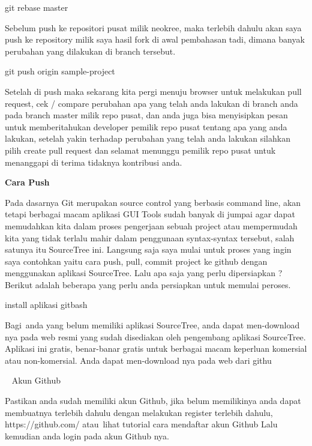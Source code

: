 \noindent 
git rebase master \par
\noindent 
Sebelum push ke repositori pusat milik neokree, maka terlebih dahulu akan saya push ke repository milik saya hasil fork di awal pembahasan tadi, dimana banyak perubahan yang dilakukan di branch tersebut. \par
\noindent 
git push origin sample-project \par
\noindent 
Setelah di push maka sekarang kita pergi menuju browser untuk melakukan pull request, cek / compare perubahan apa yang telah anda lakukan di branch anda pada branch master milik repo pusat, dan anda juga bisa menyisipkan pesan untuk memberitahukan developer pemilik repo pusat tentang apa yang anda lakukan, setelah yakin terhadap perubahan yang telah anda lakukan silahkan pilih create pull request dan selamat menunggu pemilik repo pusat untuk menanggapi di terima tidaknya kontribusi anda. \par
\vspace{12pt}
\noindent 
\textbf{Cara Push} \par
\vspace{12pt}
\noindent 
Pada dasarnya Git merupakan source control yang berbasis command line, akan tetapi berbagai macam aplikasi GUI Tools sudah banyak di jumpai agar dapat memudahkan kita dalam proses pengerjaan sebuah project atau mempermudah kita yang tidak terlalu mahir dalam penggunaan syntax-syntax tersebut, salah satunya itu SourceTree ini.\vspace{\baselineskip}
\vspace{\baselineskip}
Langsung saja saya mulai untuk proses yang ingin saya contohkan yaitu cara push, pull, commit project ke github dengan menggunakan aplikasi SourceTree. Lalu apa saja yang perlu dipersiapkan ? Berikut adalah beberapa yang perlu anda persiapkan untuk memulai peroses. \par
{} install aplikasi gitbash \par
\noindent 
Bagi~anda yang belum memiliki aplikasi SourceTree, anda dapat men-download nya pada web resmi yang sudah disediakan oleh pengembang aplikasi SourceTree. Aplikasi ini gratis, benar-banar gratis untuk berbagai macam keperluan komersial atau non-komersial. Anda dapat men-download nya pada  web dari githu \par
{}~ Akun Github \par
\noindent 
Pastikan anda sudah memiliki akun Github, jika belum memilikinya anda dapat membuatnya terlebih dahulu dengan melakukan register terlebih dahulu, $  $https://github.com/ $  $atau~lihat tutorial cara mendaftar akun Github  Lalu kemudian anda login pada akun Github nya. \par
